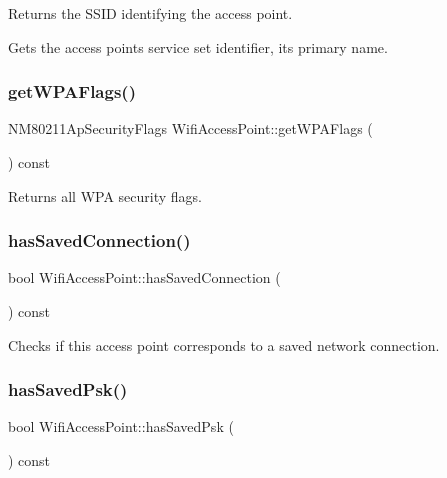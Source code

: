 \begin{DoxyReturn}{Returns}
the S\+S\+ID identifying the access point.
\end{DoxyReturn}
Gets the access point\textquotesingle{}s service set identifier, its primary name. \mbox{\label{classWifiAccessPoint_a8b289a15f425e47ea40152b114b458b1}} 
\subsubsection{\texorpdfstring{get\+W\+P\+A\+Flags()}{getWPAFlags()}}
{\footnotesize\ttfamily N\+M80211\+Ap\+Security\+Flags Wifi\+Access\+Point\+::get\+W\+P\+A\+Flags (\begin{DoxyParamCaption}{ }\end{DoxyParamCaption}) const}

\begin{DoxyReturn}{Returns}
all W\+PA security flags. 
\end{DoxyReturn}
\mbox{\label{classWifiAccessPoint_a5b7b4e337bf671c9c9ce2cbfbe69d8a2}} 
\subsubsection{\texorpdfstring{has\+Saved\+Connection()}{hasSavedConnection()}}
{\footnotesize\ttfamily bool Wifi\+Access\+Point\+::has\+Saved\+Connection (\begin{DoxyParamCaption}{ }\end{DoxyParamCaption}) const}

Checks if this access point corresponds to a saved network connection. \mbox{\label{classWifiAccessPoint_ac6c7f51b3a1145882363bfbfde8c1cd8}} 
\subsubsection{\texorpdfstring{has\+Saved\+Psk()}{hasSavedPsk()}}
{\footnotesize\ttfamily bool Wifi\+Access\+Point\+::has\+Saved\+Psk (\begin{DoxyParamCaption}{ }\end{DoxyParamCaption}) const}


